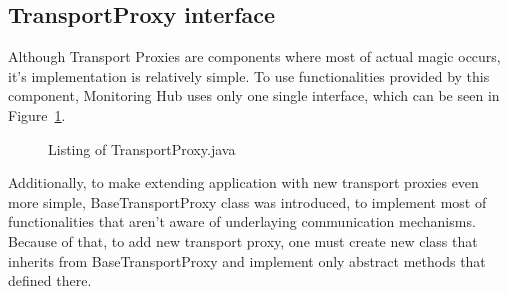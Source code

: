 \subsection{TransportProxy interface}
\label{subs:TransportProxyInterface}
Although Transport Proxies are components where most of actual magic occurs, it\rq{}s implementation is relatively simple. To use functionalities provided by this component, Monitoring Hub uses only one single interface, which can be seen in Figure~\ref{fig:transport_proxy}.

\begin{figure}[ht]
  \centering
  
  \caption{Listing of TransportProxy.java}
  \label{fig:transport_proxy}
\end{figure} 

Additionally, to make extending application with new transport proxies even more simple, BaseTransportProxy class was introduced, to implement most of functionalities that aren\rq{}t aware of underlaying communication mechanisms. Because of that, to add new transport proxy, one must create new class that inherits from BaseTransportProxy and implement only abstract methods that defined there.
